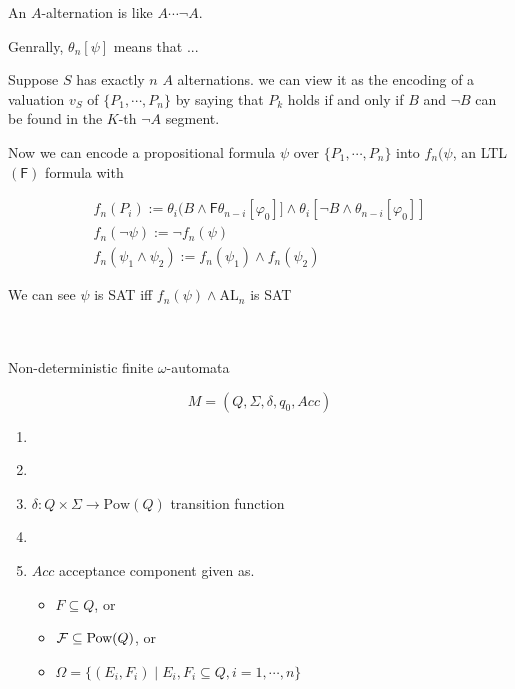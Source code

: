 \documentclass[12pt]{article}
\begin{document}
An $A$-alternation is like $A\cdots\neg A$.

Genrally, $\theta_n[\psi]$ means that ...

Suppose $S$ has exactly $n$ $A$ alternations. we can view it as the encoding of a valuation $v_S$ of $\{P_1,\cdots,P_n\}$ by saying that $P_k$ holds if and only if $B$ and $\neg B$ can be found in the $K$-th $\neg A$ segment. 

Now we can encode a propositional formula $\psi$ over $\{P_1,\cdots, P_n\}$ into $f_n(\psi$, an LTL$(\textsf{F})$ formula with

$$\begin{array}{l}f_n(P_i):=\theta_i(B\wedge \textsf{F}\theta_{n-i}[\varphi_0]]\wedge \theta_i[\neg B\wedge \theta_{n-i}[\varphi_0]]\\

f_n(\neg \psi):=\neg f_n(\psi)\\

f_n(\psi_1\wedge\psi_2):=f_n(\psi_1)\wedge f_n(\psi_2)

\end{array}$$
 

We can see $\psi$ is SAT iff $f_n(\psi)\wedge\mbox{AL}_n$ is SAT










\ \\ \ \\

Non-deterministic finite $\omega$-automata

$$M=(Q,\Sigma,\delta,q_0, Acc)$$


\begin{enumerate}
\item \ 
\item \ 
\item $\delta:Q\times\Sigma\rightarrow\mbox{Pow}(Q)$ transition function
\item \ 
\item $Acc$ acceptance component given as.
\begin{itemize}
\item $F\subseteq Q$, or
\item ${\cal F}\subseteq\mbox{Pow}(Q)$, or 
\item $\Omega=\{(E_i,F_i)\mid E_i, F_i\subseteq Q, i=1,\cdots,n\}$ 
\end{itemize}
\end{enumerate}
\end{document}
